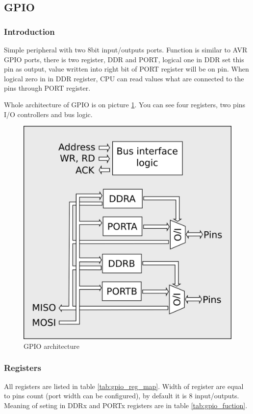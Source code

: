 \subsection{GPIO}

\subsubsection{Introduction}

Simple peripheral with two 8bit input/outputs ports. Function is similar to AVR
GPIO ports, there is two register, DDR and PORT, logical one in DDR set this
pin as output, value written into right bit of PORT register will be on pin.
When logical zero in in DDR register, CPU can read values what are connected to
the pins through PORT register.

Whole architecture of GPIO is on picture \ref{fig:gpio_arch}. You can see four
registers, two pins I/O controllers and bus logic.

\begin{figure}[]
    \centering
    \includegraphics[width=.7\textwidth]{img/GPIO.png}
    \caption{GPIO architecture}
    \label{fig:gpio_arch}
\end{figure}

\subsubsection{Registers}

All registers are listed in table \ref{tab:gpio_reg_map}. Width of register are
equal to pins count (port width can be configured), by default it is 8
input/outputs. Meaning of seting in DDRx and PORTx registers are in table
\ref{tab:gpio_fuction}.

